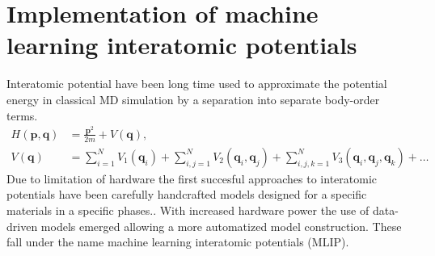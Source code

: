 \chapter{Implementation of machine learning interatomic potentials}

Interatomic potential have been long time used to approximate the potential energy in classical MD simulation by a separation into separate body-order terms.
\begin{subequations}
\begin{align}
  H(\mathbf{p}, \mathbf{q}) &= \frac{\mathbf{p}^2}{2m} + V(\mathbf{q}),\\%
  V(\mathbf{q}) &= \sum_{i = 1}^N V_1(\mathbf{q}_i) + \sum_{i,j = 1}^N V_2(\mathbf{q}_i, \mathbf{q}_j) + \sum_{i,j,k = 1}^N V_3(\mathbf{q}_i, \mathbf{q}_j, \mathbf{q}_k) + \ldots
\end{align}
\end{subequations}
Due to limitation of hardware the first succesful approaches to interatomic potentials have been carefully handcrafted models designed for a specific materials in a specific phases.\cite{stillinger1985computer, tersoff1988empirical}.
With increased hardware power the use of data-driven models emerged allowing a more automatized model construction.
These fall under the name machine learning interatomic potentials (MLIP)\cite{bartok2010gaussian,bartok2018machine}. %

